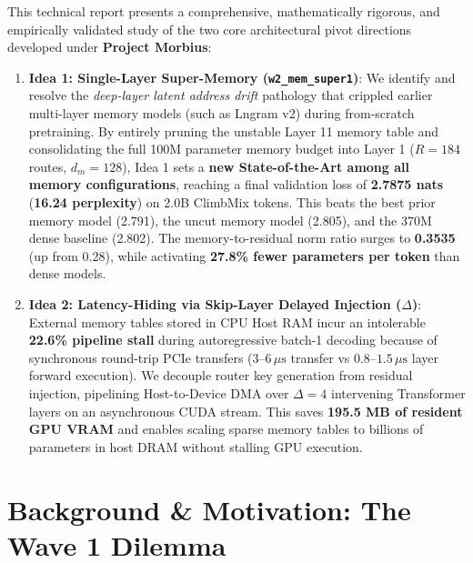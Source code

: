 \documentclass[11pt,a4paper]{article}
\begin{document}
\begin{tcolorbox}[colback=boxbg, colframe=primaryblue, title=\textbf{\color{white} Executive Summary \& Strategic Findings}, coltitle=white]
This technical report presents a comprehensive, mathematically rigorous, and empirically validated study of the two core architectural pivot directions developed under \textbf{Project Morbius}:
\begin{enumerate}[leftmargin=1.4em, itemsep=3pt]
    \item \textbf{Idea 1: Single-Layer Super-Memory (\texttt{w2\_mem\_super1})}: We identify and resolve the \emph{deep-layer latent address drift} pathology that crippled earlier multi-layer memory models (such as Lngram v2) during from-scratch pretraining. By entirely pruning the unstable Layer 11 memory table and consolidating the full 100M parameter memory budget into Layer 1 ($R = 184$ routes, $d_m = 128$), Idea 1 sets a \textbf{new State-of-the-Art among all memory configurations}, reaching a final validation loss of \textbf{2.7875 nats} (\textbf{16.24 perplexity}) on 2.0B ClimbMix tokens. This beats the best prior memory model (2.791), the uncut memory model (2.805), and the 370M dense baseline (2.802). The memory-to-residual norm ratio surges to \textbf{0.3535} (up from 0.28), while activating \textbf{27.8\% fewer parameters per token} than dense models.
    \item \textbf{Idea 2: Latency-Hiding via Skip-Layer Delayed Injection (\texorpdfstring{$\Delta$}{Delta})}: External memory tables stored in CPU Host RAM incur an intolerable \textbf{22.6\% pipeline stall} during autoregressive batch-1 decoding because of synchronous round-trip PCIe transfers ($3\text{--}6\,\mu\text{s}$ transfer vs $0.8\text{--}1.5\,\mu\text{s}$ layer forward execution). We decouple router key generation from residual injection, pipelining Host-to-Device DMA over $\Delta = 4$ intervening Transformer layers on an asynchronous CUDA stream. This saves \textbf{195.5 MB of resident GPU VRAM} and enables scaling sparse memory tables to billions of parameters in host DRAM without stalling GPU execution.
\end{enumerate}
\end{tcolorbox}

\vspace{0.5em}

\section{Background \& Motivation: The Wave 1 Dilemma}
\label{sec:background}
\end{document}
